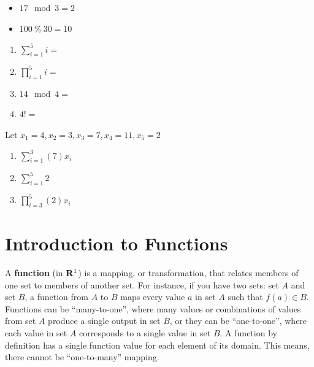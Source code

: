 \documentclass[]{book}
\providecommand{\tightlist}{%
  \setlength{\itemsep}{0pt}\setlength{\parskip}{0pt}}
\theoremstyle{definition}
\theoremstyle{definition}
\theoremstyle{definition}
\theoremstyle{remark}
\let\BeginKnitrBlock\begin \let\EndKnitrBlock\end
\begin{document}
\begin{itemize}
\tightlist
\item
  \(17 \mod 3 = 2\)
\item
  \(100 \ \% \ 30 = 10\)
\end{itemize}

\BeginKnitrBlock{example}[Operators]
\protect\hypertarget{exm:operators}{}{\label{exm:operators} {} }

\begin{enumerate}
\def\labelenumi{\arabic{enumi}.}
\item
  \(\sum\limits_{i=1}^{5} i =\)
\item
  \(\prod\limits_{i=1}^{5} i =\)
\item
  \(14 \mod 4 =\)
\item
  \(4! =\)
\end{enumerate}
\EndKnitrBlock{example}

\BeginKnitrBlock{exercise}[Operators]
\protect\hypertarget{exr:operators1}{}{\label{exr:operators1} {} }Let \(x_1 = 4, x_2 = 3, x_3 = 7, x_4 = 11, x_5 = 2\)

\begin{enumerate}
\def\labelenumi{\arabic{enumi}.}
\item
  \(\sum\limits_{i=1}^{3} (7)x_i\)
\item
  \(\sum\limits_{i=1}^{5} 2\)
\item
  \(\prod\limits_{i=3}^{5} (2)x_i\)
\end{enumerate}
\EndKnitrBlock{exercise}

\hypertarget{introduction-to-functions}{%
\section{Introduction to Functions}\label{introduction-to-functions}}

A \textbf{function} (in \({\bf R}^1\)) is a mapping, or transformation, that relates members of one set to members of another set. For instance, if you have two sets: set \(A\) and set \(B\), a function from \(A\) to \(B\) maps every value \(a\) in set \(A\) such that \(f(a) \in B\). Functions can be ``many-to-one'', where many values or combinations of values from set \(A\) produce a single output in set \(B\), or they can be ``one-to-one'', where each value in set \(A\) corresponds to a single value in set \(B\). A function by definition has a single function value for each element of its domain. This means, there cannot be ``one-to-many'' mapping.
\end{document}
